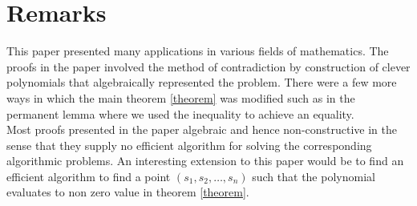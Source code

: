 \section{Remarks}
This paper presented many applications in various fields of mathematics. The proofs in the paper involved the method of contradiction by construction of clever polynomials that algebraically represented the problem. There were a few more ways in which the main theorem \ref{theorem} was modified such as in the permanent lemma where we used the inequality to achieve an equality. 
\\
Most proofs presented in the paper algebraic and hence non-constructive in the sense that they supply no efficient algorithm for solving the corresponding algorithmic problems. An interesting extension to this paper would be to find an efficient algorithm to find a point $(s_1,s_2, \ldots, s_n)$ such that the polynomial evaluates to non zero value in theorem \ref{theorem}.
